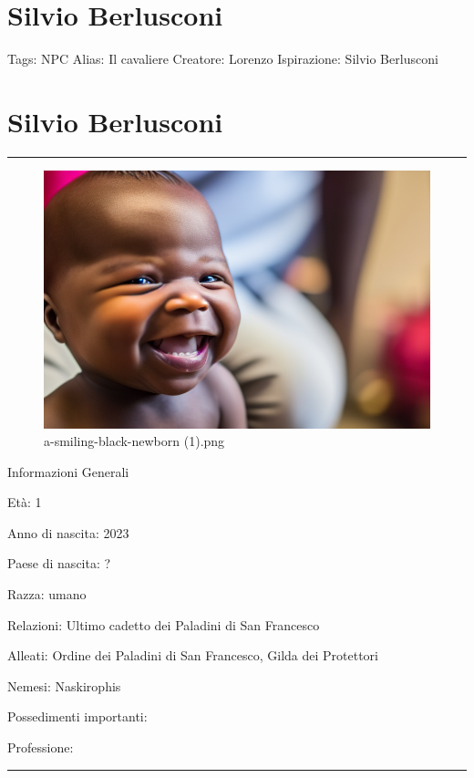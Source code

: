 \section{Silvio Berlusconi}\label{silvio-berlusconi}

Tags: NPC Alias: Il cavaliere Creatore: Lorenzo Ispirazione: Silvio
Berlusconi

\section{Silvio Berlusconi}\label{silvio-berlusconi-1}

\begin{center}\rule{0.5\linewidth}{0.5pt}\end{center}

\begin{figure}
\centering
\includegraphics{a-smiling-black-newborn_(1).png}
\caption{a-smiling-black-newborn (1).png}
\end{figure}

Informazioni Generali

Età: 1

Anno di nascita: 2023

Paese di nascita: ?

Razza: umano

Relazioni: Ultimo cadetto dei Paladini di San Francesco

Alleati: Ordine dei Paladini di San Francesco, Gilda dei Protettori

Nemesi: Naskirophis

Possedimenti importanti:

Professione:

\begin{center}\rule{0.5\linewidth}{0.5pt}\end{center}

